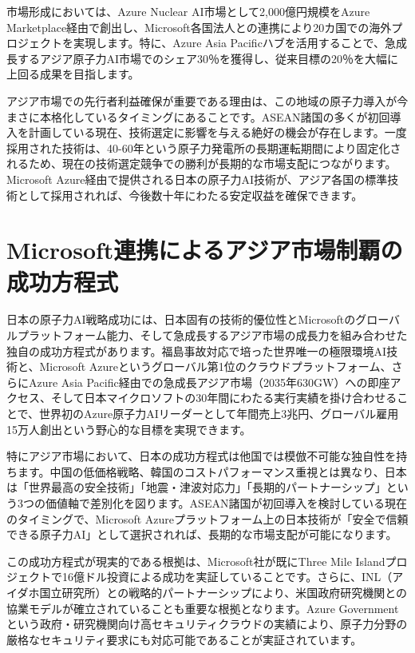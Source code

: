 \documentclass[10pt,a4paper]{jsarticle}
\begin{document}
市場形成においては、Azure Nuclear AI市場として2,000億円規模をAzure Marketplace経由で創出し、Microsoft各国法人との連携により20カ国での海外プロジェクトを実現します。特に、Azure Asia Pacificハブを活用することで、急成長するアジア原子力AI市場でのシェア30％を獲得し、従来目標の20％を大幅に上回る成果を目指します。

アジア市場での先行者利益確保が重要である理由は、この地域の原子力導入が今まさに本格化しているタイミングにあることです。ASEAN諸国の多くが初回導入を計画している現在、技術選定に影響を与える絶好の機会が存在します。一度採用された技術は、40-60年という原子力発電所の長期運転期間により固定化されるため、現在の技術選定競争での勝利が長期的な市場支配につながります。Microsoft Azure経由で提供される日本の原子力AI技術が、アジア各国の標準技術として採用されれば、今後数十年にわたる安定収益を確保できます。

\section{Microsoft連携によるアジア市場制覇の成功方程式}

日本の原子力AI戦略成功には、日本固有の技術的優位性とMicrosoftのグローバルプラットフォーム能力、そして急成長するアジア市場の成長力を組み合わせた独自の成功方程式があります。福島事故対応で培った世界唯一の極限環境AI技術と、Microsoft Azureというグローバル第1位のクラウドプラットフォーム、さらにAzure Asia Pacific経由での急成長アジア市場（2035年630GW）への即座アクセス、そして日本マイクロソフトの30年間にわたる実行実績を掛け合わせることで、世界初のAzure原子力AIリーダーとして年間売上3兆円、グローバル雇用15万人創出という野心的な目標を実現できます。

特にアジア市場において、日本の成功方程式は他国では模倣不可能な独自性を持ちます。中国の低価格戦略、韓国のコストパフォーマンス重視とは異なり、日本は「世界最高の安全技術」「地震・津波対応力」「長期的パートナーシップ」という3つの価値軸で差別化を図ります。ASEAN諸国が初回導入を検討している現在のタイミングで、Microsoft Azureプラットフォーム上の日本技術が「安全で信頼できる原子力AI」として選択されれば、長期的な市場支配が可能になります。

この成功方程式が現実的である根拠は、Microsoft社が既にThree Mile Islandプロジェクトで16億ドル投資による成功を実証していることです。さらに、INL（アイダホ国立研究所）との戦略的パートナーシップにより、米国政府研究機関との協業モデルが確立されていることも重要な根拠となります。Azure Governmentという政府・研究機関向け高セキュリティクラウドの実績により、原子力分野の厳格なセキュリティ要求にも対応可能であることが実証されています。
\end{document}
